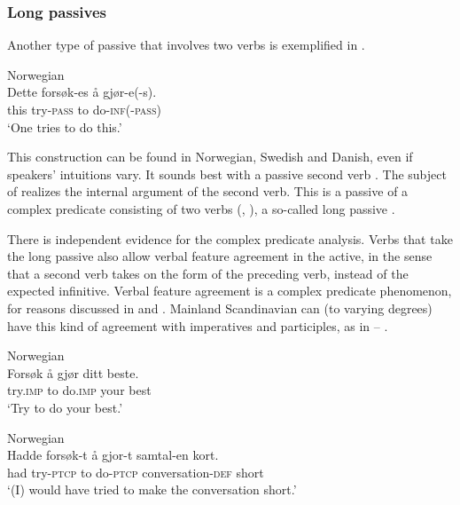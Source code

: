\documentclass[output=paper,hidelinks]{langscibook}
\begin{document}
\subsubsection{Long passives}

Another type of passive that involves two verbs is exemplified in .



\ea\label{ex:Scandinavian:90} Norwegian\\
\gll
 {Dette} {forsøk-es} {å} {gjør-e(-s).}\\
 this try-\textsc{pass} to do-\textsc{inf}(-\textsc{pass)}\\
\glt `One tries to do this.'\z

\noindent This construction can be found in Norwegian, Swedish and Danish, even if speakers' intuitions vary. It sounds best with a passive second verb \citep{Lodrup2014lp}. The subject of  realizes the internal argument of the second verb. This is a passive of a complex predicate consisting of two verbs (\citealt{Butt1995,alsina1996the-role,Sells2004}, ), a so-called long passive \citep{Lodrup2014lp}.

 There is independent evidence for the complex predicate analysis. Verbs that take the long passive also allow verbal feature agreement in the active, in the sense that a second verb takes on the form of the preceding verb, instead of the expected infinitive. Verbal feature agreement is a complex predicate phenomenon, for reasons discussed in \citet{Nino1997} and \citet{Sells2004}. Mainland Scandinavian can (to varying degrees) have this kind of agreement with imperatives and participles, as in -- \citep{Havnelid15,Aagaard16}.



\ea\label{ex:Scandinavian:91} Norwegian\\
\gll
 {Forsøk} {å} {gjør} {ditt} {beste.}\\
 try.\textsc{imp} to do.\textsc{imp} your best \\
\glt `Try to do your best.' \z



\ea\label{ex:Scandinavian:92} Norwegian\\
\gll
 {Hadde} {forsøk-t} {å} {gjor-t} {samtal-en} {kort.}\\
 had try-\textsc{ptcp} to do-\textsc{ptcp} conversation-\textsc{def} short \\
\glt `(I) would have tried to make the conversation short.' \z
\end{document}
